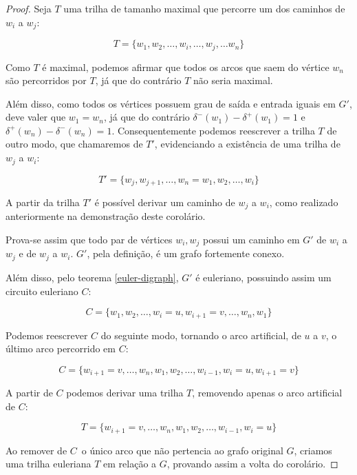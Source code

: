 \documentclass[12pt, a4paper]{article}
\begin{document}
\begin{proof}
    Seja $T$ uma trilha de tamanho maximal que percorre um dos caminhos de $w_i$ a $w_j$:

    \[ T = \{w_1, w_2, \dots, w_i, \dots, w_j, \dots w_n\} \]

    Como $T$ é maximal, podemos afirmar que todos os arcos que saem do vértice $w_n$ são percorridos por $T$, já que do contrário $T$ não seria maximal.

    Além disso, como todos os vértices possuem grau de saída e entrada iguais em $G'$, deve valer que $w_1 = w_n$, já que do contrário $\delta^-(w_1) - \delta^+(w_1) = 1$ e $\delta^+(w_n) - \delta^-(w_n) = 1$.
    Consequentemente podemos reescrever a trilha $T$ de outro modo, que chamaremos de $T'$, evidenciando a existência de uma trilha de $w_j$ a $w_i$:

    \[T' = \{w_j, w_{j+1}, \dots, w_n = w_1, w_2, \dots, w_i\} \]

    A partir da trilha $T'$ é possível derivar um caminho de $w_j$ a $w_i$, como realizado anteriormente na demonstração deste corolário.

    Prova-se assim que todo par de vértices $w_i, w_j$ possui um caminho em $G'$ de $w_i$ a $w_j$ e de $w_j$ a $w_i$. 
    $G'$, pela definição, é um grafo fortemente conexo.

    Além disso, pelo teorema \ref{euler-digraph}, $G'$ é euleriano, possuindo assim um circuito euleriano $C$:

    \[ C = \{w_1, w_2, \dots, w_i = u, w_{i+1} = v, \dots, w_n, w_1 \} \]

    Podemos reescrever $C$ do seguinte modo, tornando o arco artificial, de $u$ a $v$, o último arco percorrido em $C$:

    \[ C = \{w_{i+1} = v, \dots, w_n, w_1, w_2, \dots, w_{i-1}, w_i = u, w_{i+1} = v\} \]

    A partir de $C$ podemos derivar uma trilha $T$, removendo apenas o arco artificial de $C$:

    \[T = \{w_{i+1} = v, \dots, w_n, w_1, w_2, \dots, w_{i-1}, w_i = u\} \]

    Ao remover de $C$ o único arco que não pertencia ao grafo original $G$, criamos uma trilha euleriana $T$ em relação a $G$, provando assim a volta do corolário.

\end{proof}

%
\end{document}
